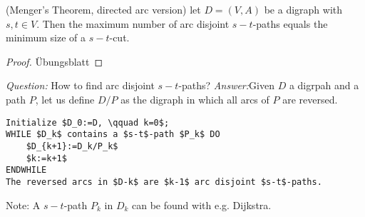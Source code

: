\begin{cor}(Menger's Theorem, directed arc version)
let $D=(V,A)$ be a digraph with $s,t  \in V$. Then the maximum number of arc
disjoint $s-t$-paths equals the minimum size of a $s-t$-cut.
\end{cor}
\begin{proof}
Übungsblatt
\end{proof}

\emph{Question:} How to find arc disjoint $s-t$-paths?
\emph{Answer:}Given $D$ a digrpah and a path $P$, let us define $D/P$ as the
digraph in which all arcs of $P$ are reversed.

\begin{lstlisting}
Initialize $D_0:=D, \qquad k=0$;
WHILE $D_k$ contains a $s-t$-path $P_k$ DO
	$D_{k+1}:=D_k/P_k$
	$k:=k+1$
ENDWHILE
The reversed arcs in $D-k$ are $k-1$ arc disjoint $s-t$-paths.
\end{lstlisting}
Note: A $s-t$-path $P_k$ in $D_k$ can be found with e.g. Dijkstra. 